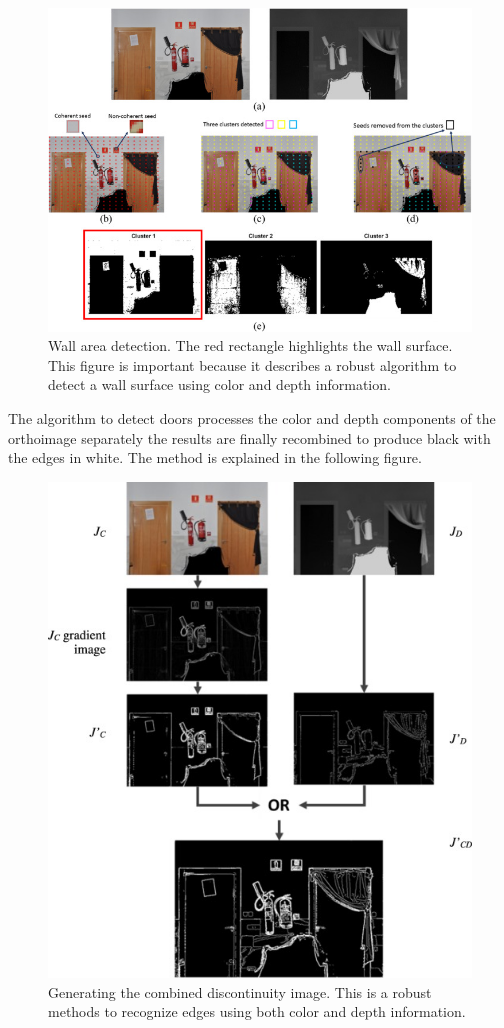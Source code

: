 \begin{figure}[h!]
	\centering
	\includegraphics[width=0.8\linewidth]{images/wallrec.jpg}
	\caption{Wall area detection. The red rectangle highlights the wall surface. This figure is important because it describes a robust algorithm to detect a wall surface using color and depth information.}
\end{figure}

\newpage

The algorithm to detect doors processes the color and depth components of the orthoimage separately the results are finally recombined to produce black with the edges in white. The method is explained in the following figure.

\begin{figure}[h!]
	\centering
	\includegraphics[width=0.6\linewidth]{images/rgbd_edges.jpg}
	\caption{Generating the combined discontinuity image. This is a robust methods to recognize edges using both color and depth information.}
\end{figure}


